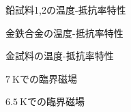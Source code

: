 \documentclass[uplatex,a4j,11pt,dvipdfmx]{jsarticle}
\newcommand{\gnu}[2]{
\begin{figure}[hptb]
\begin{center}

\caption{#1}
\label{fig:#2}
\end{center}
\end{figure}
}
\begin{document}
\gnu{鉛試料1,2の温度-抵抗率特性}{graph/day2/Pb.tex}
\gnu{金鉄合金の温度-抵抗率特性}{graph/day2/AuFe.tex}
\gnu{金試料の温度-抵抗率特性}{graph/day2/Au.tex}
\gnu{$7\ \si{\kelvin}$での臨界磁場}{graph/day3/7k.tex}
\gnu{$6.5\ \si{\kelvin}$での臨界磁場}{graph/day3/6_5k.tex}

\end{document}
